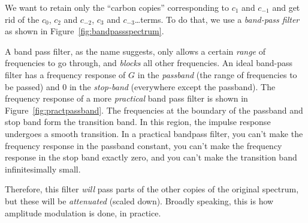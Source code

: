 We want to retain only the ``carbon copies'' corresponding to  $c_1$ and $c_{-1}$ and get rid of the $c_0$, $c_2$ and $c_{-2}$, $c_3$ and $c_{-3}$\ldots terms. To do that, we use a \emph{band-pass filter} as shown in Figure~\ref{fig:bandpassspectrum}.

A band pass filter, as the name suggests, only allows a certain \emph{range} of frequencies to go through, and \emph{blocks} all other frequencies. An ideal band-pass filter has a frequency response of $G$ in the \emph{passband} (the range of frequencies to be passed) and $0$ in the \emph{stop-band} (everywhere except the passband). The frequency response of a more \emph{practical} band pass filter is shown in Figure~\ref{fig:practpassband}. The frequencies at the boundary of the passband and stop band form the transition band. In this region, the impulse response undergoes a smooth transition. In a practical bandpass filter, you can't make the frequency response in the passband constant, you can't make the frequency response in the stop band exactly zero, and you can't make the transition band infinitesimally small.

Therefore, this filter \emph{will} pass parts of the other copies of the original spectrum, but these will be \emph{attenuated} (scaled down). Broadly speaking, this is how amplitude modulation is done, in practice.


